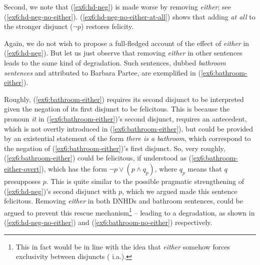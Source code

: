 Second, we note that (\ref{ex6:hd-neg}) is made worse by removing \textit{either}; see (\ref{ex6:hd-neg-no-either}). (\ref{ex6:hd-neg-no-either-at-all}) shows that adding \textit{at all} to the stronger disjunct ($\neg p$) restores felicity.

\begin{exe}
	\ex
	\begin{xlist}	
		\label{ex6:hd-neg-no-either}
		\label{ex6:hd-neg-no-either-at-all}
	\end{xlist}
\end{exe}

Again, we do not wish to propose a full-fledged account of the effect of \textit{either} in (\ref{ex6:hd-neg}). But let us just observe that removing \textit{either} in other sentences leads to the same kind of degradation. Such sentences, dubbed \textit{bathroom sentences} \parencite{Evans1977} and attributed to Barbara Partee, are exemplified in (\ref{ex6:bathroom-either}). 

\begin{exe}
	\ex \label{ex6:bathroom}
	\begin{xlist}
		\label{ex6:bathroom-either}
		\label{ex6:bathroom-no-either}
		\label{ex6:bathroom-either-overt}
	\end{xlist}
\end{exe}
Roughly, (\ref{ex6:bathroom-either}) requires its second disjunct to be interpreted given the negation of its first disjunct to be felicitous. This is because the pronoun \textit{it} in (\ref{ex6:bathroom-either})'s second disjunct, requires an antecedent, which is not overtly introduced in (\ref{ex6:bathroom-either}), but could be provided by an existential statement of the form \textit{there is a bathroom}, which correspond to the negation of (\ref{ex6:bathroom-either})'s first disjunct. So, very roughly, (\ref{ex6:bathroom-either}) could be felicitous, if understood as (\ref{ex6:bathroom-either-overt}), which has the form $\neg p \vee (p \wedge q_p)$, where $q_p$ means that $q$ presupposes $p$. This is quite similar to the possible pragmatic strengthening of (\ref{ex6:hd-neg})'s second disjunct with $p$, which we argued made this sentence felicitous. Removing \textit{either} in both DNHDs and bathroom sentences, could be argued to prevent this rescue mechanism\footnote{This in fact would be in line with the idea that \textit{either} somehow forces exclusivity between disjuncts ( i.a.).} -- leading to a degradation, as shown in (\ref{ex6:hd-neg-no-either}) and (\ref{ex6:bathroom-no-either}) respectively.\\


